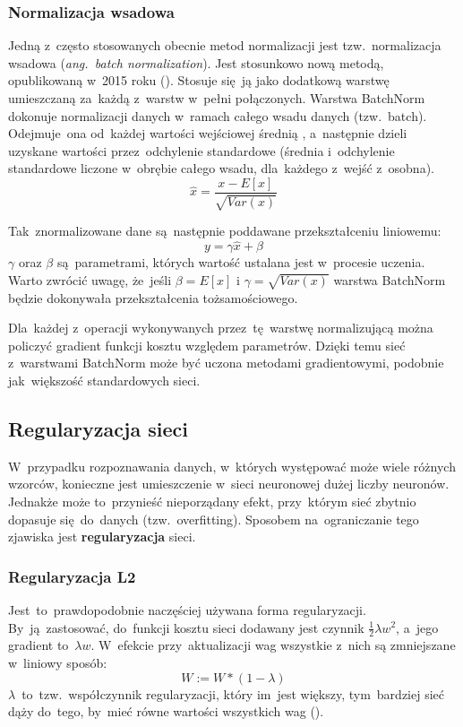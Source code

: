 \subsubsection{Normalizacja wsadowa}
Jedną z~często stosowanych obecnie metod normalizacji jest tzw.~normalizacja wsadowa (\textit{ang.~batch normalization}).
Jest stosunkowo nową metodą, opublikowaną w~2015 roku (\cite{batch-norm}). Stosuje się~ją jako
dodatkową warstwę umieszczaną za~każdą z~warstw w~pełni połączonych. Warstwa BatchNorm dokonuje normalizacji danych
w~ramach całego wsadu danych (tzw.~batch). Odejmuje~ona od~każdej wartości wejściowej średnią , a~następnie dzieli
uzyskane wartości przez~odchylenie standardowe (średnia i~odchylenie standardowe liczone w~obrębie całego wsadu,
dla~każdego z~wejść z~osobna).
\begin{equation*}
 \widehat{x} = \frac{x - E[x]}{\sqrt{Var(x)}}
\end{equation*}

Tak~znormalizowane dane są~następnie poddawane przekształceniu liniowemu:
\begin{equation*}
y = \gamma\widehat{x} + \beta
\end{equation*}
$\gamma$ oraz $\beta$ są~parametrami, których wartość ustalana jest w~procesie uczenia. Warto zwrócić uwagę, że~jeśli
$\beta=E[x]$ i $\gamma=\sqrt{Var(x)}$ warstwa BatchNorm będzie dokonywała przekształcenia tożsamościowego.

Dla~każdej z~operacji wykonywanych przez~tę~warstwę normalizującą można policzyć gradient funkcji kosztu względem
parametrów. Dzięki temu sieć z~warstwami BatchNorm może być uczona metodami gradientowymi, podobnie jak~większość
standardowych sieci.

\subsection{Regularyzacja sieci}
W~przypadku rozpoznawania danych, w~których występować może wiele różnych wzorców, konieczne jest umieszczenie w~sieci
neuronowej dużej liczby neuronów. Jednakże może to~przynieść nieporządany efekt, przy~którym sieć zbytnio dopasuje
się~do~danych (tzw.~overfitting). Sposobem na~ograniczanie tego zjawiska jest \textbf{regularyzacja} sieci.

\subsubsection{Regularyzacja L2} \label{sssec:reg_L2}
Jest~to~prawdopodobnie naczęściej używana forma regularyzacji. By~ją~zastosować, do~funkcji kosztu sieci dodawany
jest czynnik $\frac{1}{2}\lambda w^2$, a~jego gradient to~$\lambda w$. W~efekcie przy~aktualizacji wag wszystkie
z~nich są zmniejszane w~liniowy sposób:
\begin{equation*}
W := W*(1 -\lambda)
\end{equation*}
$\lambda$~to~tzw.~współczynnik regularyzacji, który im~jest większy, tym~bardziej sieć dąży do~tego,
by~mieć równe wartości wszystkich wag (\cite{L2-regularization}).

